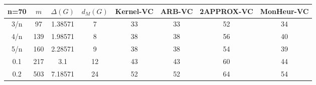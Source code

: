 \begin{tabular}{||c||ccc||cccc||}
 \hline \hline 
 n=70&$m$&$\Delta (G)$&$d_M(G)$& Kernel-VC & ARB-VC & 2APPROX-VC & MonHeur-VC\\ \hline \hline
3/n&97&1.38571&7&33&33&52&34\\
4/n&139&1.98571&8&38&38&56&40\\
5/n&160&2.28571&9&38&38&54&39\\
0.1&217&3.1&12&43&43&60&44\\
0.2&503&7.18571&24&52&52&64&54\\
\hline \end{tabular}

